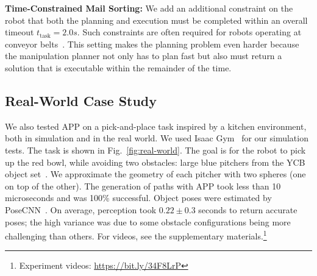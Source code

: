 \documentclass[a4paper]{report}
\begin{document}
\textbf{Time-Constrained Mail Sorting:}
We add an additional constraint on the robot that both the planning and execution must be completed within an overall timeout $t_\textrm{task}=2.0s$. Such constraints are often required for robots operating at conveyor belts~\cite{islam2020provably}. This setting makes the planning problem even harder because the manipulation planner not only has to plan fast but also must return a solution that is executable within the remainder of the time.

\subsection{Real-World Case Study}
We also tested APP on a pick-and-place task inspired by a kitchen environment, both in simulation and in the real world. We used Isaac Gym~\cite{liang2018gpu} for our simulation tests. The task is shown in Fig.~\ref{fig:real-world}. The goal is for the robot to pick up the red bowl, while avoiding two obstacles: large blue pitchers from the YCB object set~\cite{calli2015ycb}. We approximate the geometry of each pitcher with two spheres (one on top of the other).
The generation of paths with APP took less than 10 microseconds and was 100\% successful. Object poses were estimated by PoseCNN~\cite{xiang2017posecnn}.
On average, perception took $0.22 \pm 0.3$ seconds to return accurate poses; the high variance was due to some obstacle configurations being more challenging than others. For videos, see the supplementary materials.\footnote{Experiment videos: \url{https://bit.ly/34F8LrP}}
\end{document}
